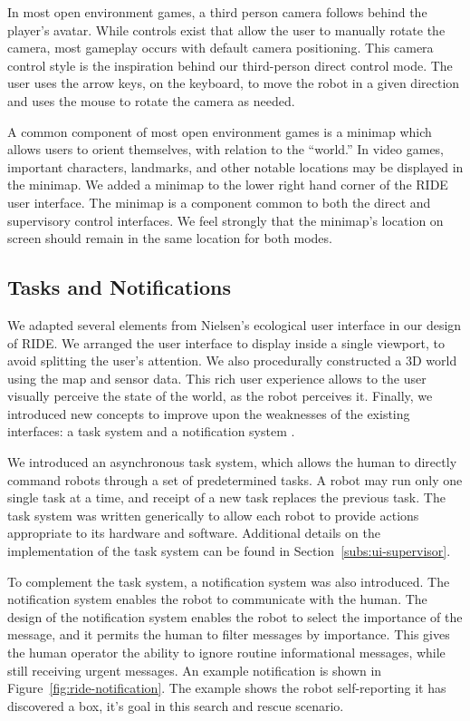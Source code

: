 In most open environment games, a third person camera follows behind the player's avatar. While controls exist that allow the user to manually rotate the camera, most gameplay occurs with default camera positioning. This camera control style is the inspiration behind our third-person direct control mode. The user uses the arrow keys, on the keyboard, to move the robot in a given direction and uses the mouse to rotate the camera as needed.

A common component of most open environment games is a minimap which allows users to orient themselves, with relation to the ``world.'' In video games, important characters, landmarks, and other notable locations may be displayed in the minimap. We added a minimap to the lower right hand corner of the RIDE user interface. The minimap is a component common to both the direct and supervisory control interfaces. We feel strongly that the minimap's location on screen should remain in the same location for both modes.

\subsection{Tasks and Notifications}
We adapted several elements from Nielsen's ecological user interface in our design of RIDE. We arranged the user interface to display inside a single viewport, to avoid splitting the user's attention. We also procedurally constructed a 3D world using the map and sensor data. This rich user experience allows to the user visually perceive the state of the world, as the robot perceives it. Finally, we introduced new concepts to improve upon the weaknesses of the existing interfaces: a task system and a notification system \cite{Nielsen_Teleoperation}.

We introduced an asynchronous task system, which allows the human to directly command robots through a set of predetermined tasks. A robot may run only one single task at a time, and receipt of a new task replaces the previous task. The task system was written generically to allow each robot to provide actions appropriate to its hardware and software. Additional details on the implementation of the task system can be found in Section~\ref{subs:ui-supervisor}.

To complement the task system, a notification system was also introduced. The notification system enables the robot to communicate with the human. The design of the notification system enables the robot to select the importance of the message, and it permits the human to filter messages by importance. This gives the human operator the ability to ignore routine informational messages, while still receiving urgent messages. An example notification is shown in Figure~\ref{fig:ride-notification}. The example shows the robot self-reporting it has discovered a box, it's goal in this search and rescue scenario.

